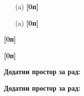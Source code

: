 \documentclass[10pt, a4paper, twoside]{article}
\begin{document}
\newpage

\noindent
{}
\begin{minipage}[t]{0.93\textwidth}
\begin{enumerate}
\itemsep0pt
\item[(a)] \textbf{[0п]}
\end{enumerate}
\end{minipage}

\newpage


\noindent
{}
\begin{minipage}[t]{0.93\textwidth}
\begin{enumerate}
\itemsep0pt
\item[(a)] \textbf{[0п]}

\end{enumerate}
\end{minipage}


\newpage

\noindent
\begin{minipage}[t]{0.6\linewidth}
\noindent
{} \textbf{[0п]} 
\end{minipage}
\begin{minipage}[t]{0.4\linewidth}
\begin{flushright}
	\vspace{-10pt}
\end{flushright}
\end{minipage}

\vfill

\newpage

\noindent
\begin{minipage}[t]{0.7\linewidth}
\noindent
{} \textbf{[0п]}
\end{minipage}
\begin{minipage}[t]{0.3\linewidth}
\begin{flushright}
	\vspace*{0pt}
\end{flushright}
\end{minipage}



\newpage

\textbf{Додатни простор за рад:}

\newpage

\textbf{Додатни простор за рад:}
\end{document}
